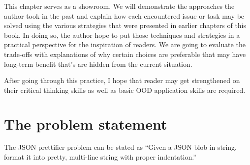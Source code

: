 \documentclass[oneside,11pt]{book}
\theoremstyle{definition}
\theoremstyle{remark}
\begin{document}
This chapter serves as a showroom.
We will demonstrate the approaches the author took in the past and
explain how each encountered issue or task may be solved using the various strategies that were
presented in earlier chapters of this book.
In doing so, the author hope to put those techniques and strategies in a practical perspective
for the inspiration of readers.
We are going to evaluate the trade-offs with explanations of why certain choices are preferable
that may have long-term benefit that's are hidden from the current situation.

After going through this practice, I hope that reader may get strengthened on their critical
thinking skills as well as basic OOD application skills are required.

\section{The problem statement}\label{sec:theProblemStatement.Json}

The JSON prettifier problem can be stated as ``Given a JSON blob in string, format
it into pretty, multi-line string with proper indentation.''
\end{document}
